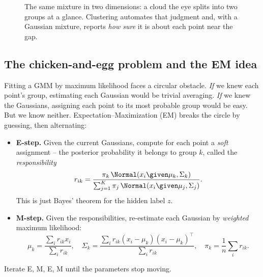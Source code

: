 \begin{figure}[H]
\centering
{}
\caption{The same mixture in two dimensions: a cloud the eye splits into two
groups at a glance. Clustering automates that judgment and, with a Gaussian
mixture, reports \emph{how sure} it is about each point near the gap.}
\label{ch34:fig-scatter}
\end{figure}

\subsection{The chicken-and-egg problem and the EM idea}

Fitting a GMM by maximum likelihood faces a circular obstacle. \emph{If} we knew
each point's group, estimating each Gaussian would be trivial averaging. \emph{If}
we knew the Gaussians, assigning each point to its most probable group would be
easy. But we know neither. Expectation--Maximization (EM) breaks the circle by
guessing, then alternating:

\begin{itemize}
  \item \textbf{E-step.} Given the current Gaussians, compute for each point a
  \emph{soft} assignment -- the posterior probability it belongs to group $k$,
  called the \emph{responsibility}
  \[
    r_{ik} = \frac{\pi_k\,\Normal(x_i\given\mu_k,\Sigma_k)}
                  {\sum_{j=1}^K \pi_j\,\Normal(x_i\given\mu_j,\Sigma_j)}.
  \]
  This is just Bayes' theorem for the hidden label $z$.
  \item \textbf{M-step.} Given the responsibilities, re-estimate each Gaussian by
  \emph{weighted} maximum likelihood:
  \[
    \mu_k = \frac{\sum_i r_{ik} x_i}{\sum_i r_{ik}}, \quad
    \Sigma_k = \frac{\sum_i r_{ik}(x_i-\mu_k)(x_i-\mu_k)^\top}{\sum_i r_{ik}}, \quad
    \pi_k = \frac{1}{n}\sum_i r_{ik}.
  \]
\end{itemize}
Iterate E, M, E, M until the parameters stop moving.

